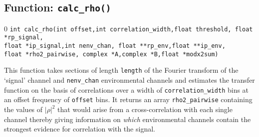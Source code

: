 \clearpage
\subsection{Function: {\tt calc\_rho()}}
\setcounter{equation}0
{\tt int calc\_rho(int offset,int correlation\_width,float threshold,
               float *rp\_signal,\\float *ip\_signal,int nenv\_chan,
               float **rp\_env,float **ip\_env,\\ float *rho2\_pairwise,
               complex *A,complex *B,float *modx2sum)} 

This function takes sections of length {\tt length} of the Fourier
transform of the `signal' channel and {\tt nenv\_chan} environmental
channels and estimates the transfer function on the basis of
correlations over a width  of {\tt correlation\_width} bins at an
offset frequency of {\tt offset} bins.  It returns an array {\tt rho2\_pairwise}
containing the values of $|\rho|^2$ that would arise from a
cross-correlation with each single channel thereby giving information
on {\it which}
environmental channels contain the strongest evidence for correlation with 
the signal.

